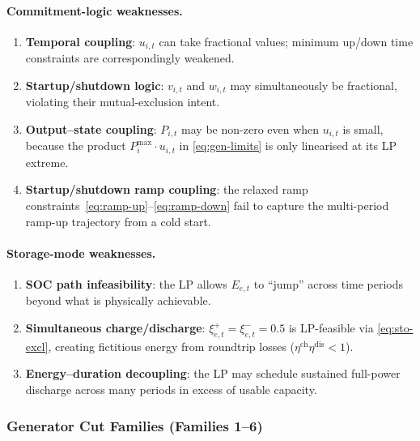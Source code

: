 \paragraph{Commitment-logic weaknesses.}
\begin{enumerate}[label=(\roman*)]
  \item \textbf{Temporal coupling}: $u_{i,t}$ can take fractional values;
        minimum up/down time constraints are correspondingly weakened.
  \item \textbf{Startup/shutdown logic}: $v_{i,t}$ and $w_{i,t}$ may
        simultaneously be fractional, violating their mutual-exclusion intent.
  \item \textbf{Output--state coupling}: $P_{i,t}$ may be non-zero even when
        $u_{i,t}$ is small, because the product $P^{\max}_i \cdot u_{i,t}$ in
        \eqref{eq:gen-limits} is only linearised at its LP extreme.
  \item \textbf{Startup/shutdown ramp coupling}: the relaxed ramp
        constraints~\eqref{eq:ramp-up}--\eqref{eq:ramp-down} fail to capture
        the multi-period ramp-up trajectory from a cold start.
\end{enumerate}

\paragraph{Storage-mode weaknesses.}
\begin{enumerate}[label=(\roman*)]
  \item \textbf{SOC path infeasibility}: the LP allows $E_{e,t}$ to
        ``jump'' across time periods beyond what is physically achievable.
  \item \textbf{Simultaneous charge/discharge}: $\xi^+_{e,t}=\xi^-_{e,t}=0.5$
        is LP-feasible via \eqref{eq:sto-excl}, creating fictitious energy from
        roundtrip losses ($\eta^{\mathrm{ch}} \eta^{\mathrm{dis}} < 1$).
  \item \textbf{Energy--duration decoupling}: the LP may schedule sustained
        full-power discharge across many periods in excess of usable capacity.
\end{enumerate}

\subsubsection{Generator Cut Families (Families 1--6)}
\label{sec:gen-cuts}

